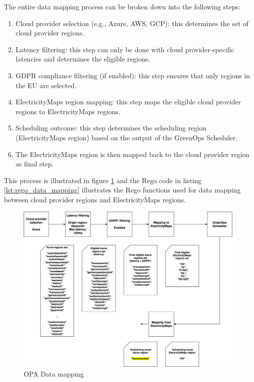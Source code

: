 The entire data mapping process can be broken down into the following steps:
\begin{enumerate}[itemsep=0.2pt, topsep=1pt]
  \item Cloud provider selection (e.g., Azure, AWS, GCP): this determines the set of cloud provider regions.
  \item Latency filtering: this step can only be done with cloud provider-specific latencies and determines the eligible regions.
  \item GDPR compliance filtering (if enabled): this step ensures that only regions in the EU are selected.
  \item ElectricityMaps region mapping: this step maps the eligible cloud provider regions to ElectricityMaps regions.
  \item Scheduling outcome: this step determines the scheduling region (ElectricityMaps region) based on the output of the GreenOps Scheduler.
  \item The ElectricityMaps region is then mapped back to the cloud provider region as final step. \newline
\end{enumerate}

This process is illustrated in figure \ref{fig:data_mapping} and the Rego code in listing \ref{lst:rego_data_mapping} illustrates the Rego functions used for data mapping between cloud provider regions and ElectricityMaps regions. \newline

\begin{figure}[t]
  \centering
  \includegraphics[width=1\linewidth]{images/data_mapping.png}
  \caption{OPA Data mapping}
  \label{fig:data_mapping}
\end{figure}

